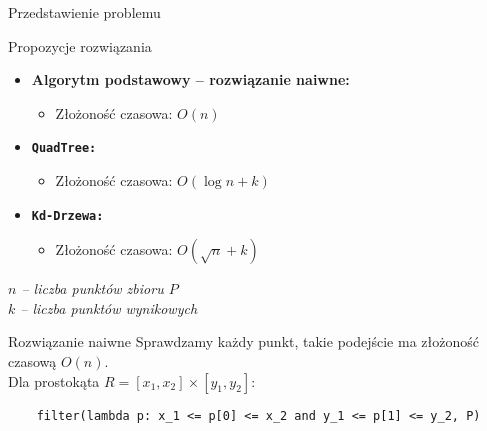 \documentclass[aspectratio=1610, polish]{beamer}
\begin{document}
\begin{section}{Przedstawienie problemu}
\begin{frame}{Propozycje rozwiązania}
\begin{itemize}
    \item \textbf{Algorytm podstawowy -- rozwiązanie naiwne:}
    \begin{itemize}
        \item Złożoność czasowa: \( O(n) \)
    \end{itemize}
    \item \textbf\texttt{QuadTree:}
    \begin{itemize}
        \item Złożoność czasowa: \( O(\log n + k) \)
    \end{itemize}
    \item \textbf\texttt{Kd-Drzewa:}
    \begin{itemize}
        \item Złożoność czasowa: \( O(\sqrt{n} + k) \)
    \end{itemize}
\end{itemize}

\vspace{0.5cm}
\textit{\footnotesize $n$ -- liczba punktów zbioru $P$} \\
\textit{\footnotesize $k$ -- liczba punktów wynikowych}
\end{frame}

\begin{frame}[fragile]{Rozwiązanie naiwne}
        Sprawdzamy każdy punkt, takie podejście ma złożoność czasową $O(n)$. \\
    
        \pause
        Dla prostokąta $R = [x_1, x_2] \times [y_1, y_2]$:
        \begin{verbatim}
    filter(lambda p: x_1 <= p[0] <= x_2 and y_1 <= p[1] <= y_2, P)
        \end{verbatim}
\end{frame}
\end{section}
\end{document}
